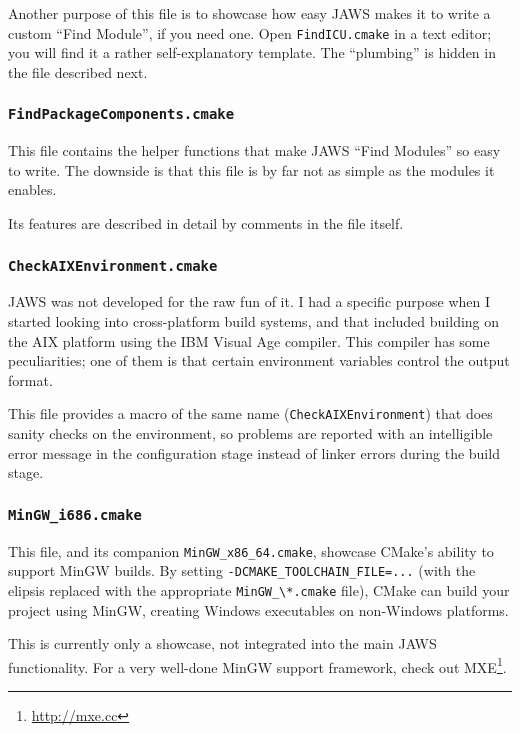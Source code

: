 Another purpose of this file is to showcase how easy JAWS makes it to write a custom ``Find Module'', if you need one. Open \lstinline{FindICU.cmake} in a text editor; you will find it a rather self-explanatory template. The ``plumbing'' is hidden in the file described next.

\subsubsection{\texttt{FindPackageComponents.cmake}}

This file contains the helper functions that make JAWS ``Find Modules'' so easy to write. The downside is that this file is by far not as simple as the modules it enables.

Its features are described in detail by comments in the file itself.

\subsubsection{\texttt{CheckAIXEnvironment.cmake}}

JAWS was not developed for the raw fun of it. I had a specific purpose when I started looking into cross-platform build systems, and that included building on the AIX platform using the IBM Visual Age compiler. This compiler has some peculiarities; one of them is that certain environment variables control the output format.

This file provides a macro of the same name (\lstinline{CheckAIXEnvironment}) that does sanity checks on the environment, so problems are reported with an intelligible error message in the configuration stage instead of linker errors during the build stage.

\subsubsection{\texttt{MinGW_i686.cmake}}

This file, and its companion \lstinline{MinGW_x86_64.cmake}, showcase CMake's ability to support MinGW builds. By setting \lstinline{-DCMAKE_TOOLCHAIN_FILE=...} (with the elipsis replaced with the appropriate \lstinline{MinGW_\*.cmake} file), CMake can build your project using MinGW, creating Windows executables on non-Windows platforms.

This is currently only a showcase, not integrated into the main JAWS functionality. For a very well-done MinGW support framework, check out MXE\footnote{\url{http://mxe.cc}}.

